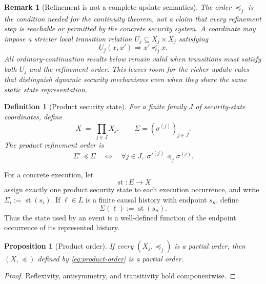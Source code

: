 \documentclass[10pt,twocolumn]{article}
\newcommand{\state}{\Sigma}
\newcommand{\coord}{\sigma}
\newcommand{\st}{\operatorname{st}}
\newtheorem{definition}{Definition}
\newtheorem{proposition}{Proposition}
\newtheorem{remark}{Remark}
\begin{document}
\begin{remark}[Refinement is not a complete update semantics]
The order $\preceq_j$ is the condition needed for the continuity theorem, not
a claim that every refinement step is reachable or permitted by the concrete
security system.  A coordinate may impose a stricter local transition relation
$U_j\subseteq X_j\times X_j$ satisfying
\begin{equation}
  U_j(x,x')\Longrightarrow x'\preceq_j x.
\end{equation}
All ordinary-continuation results below remain valid when transitions must
satisfy both $U_j$ and the refinement order.  This leaves room for the richer
update rules that distinguish dynamic security mechanisms even when they share
the same static state representation.
\end{remark}

\begin{definition}[Product security state]
For a finite family $J$ of security-state coordinates, define
\begin{equation}
  X \;=\; \prod_{j\in J} X_j,
  \qquad
  \state=(\coord^{(j)})_{j\in J}.
\end{equation}
The product refinement order is
\begin{equation}
  \state'\preceq\state
  \quad\Longleftrightarrow\quad
  \forall j\in J,\;
  \coord'^{(j)}\preceq_j\coord^{(j)}.
  \label{eq:product-order}
\end{equation}
\end{definition}

For a concrete execution, let
\begin{equation}
  \st:E\to X
\end{equation}
assign exactly one product security state to each execution occurrence, and
write $\state_i:=\st(s_i)$. If $\ell\in L$ is a finite causal history with
endpoint $s_n$, define
\begin{equation}
  \state(\ell):=\st(s_n).
  \label{eq:lineage-endpoint-state}
\end{equation}
Thus the state used by an event is a well-defined function of the endpoint
occurrence of its represented history.

\begin{proposition}[Product order]
If every $(X_j,\preceq_j)$ is a partial order, then
$(X,\preceq)$ defined by \eqref{eq:product-order} is a partial order.
\end{proposition}

\begin{proof}
Reflexivity, antisymmetry, and transitivity hold componentwise.
\end{proof}
\end{document}

